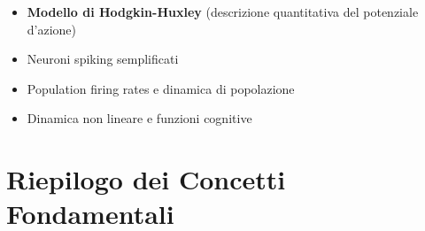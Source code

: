 \begin{itemize}
    \item \textbf{Modello di Hodgkin-Huxley} (descrizione quantitativa del potenziale d'azione)
    \item Neuroni spiking semplificati
    \item Population firing rates e dinamica di popolazione
    \item Dinamica non lineare e funzioni cognitive
\end{itemize}

\newpage


\section*{Riepilogo dei Concetti Fondamentali}

